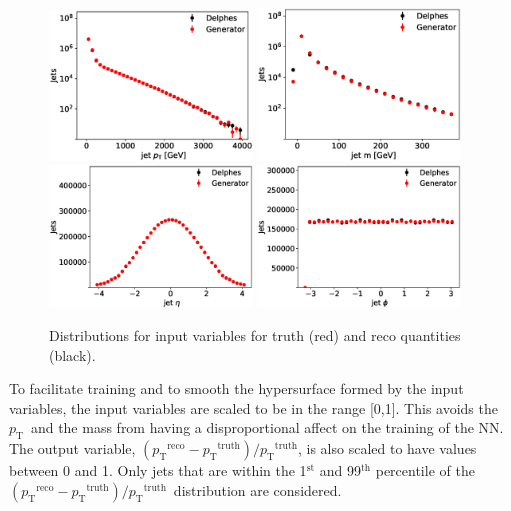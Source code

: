 \documentclass[showpacs,showkeys,preprint,prd,nofootinbib,linenumbers,12pt,superscriptaddress]{revtex4-1}
\def\pt{\ensuremath{p_{\mathrm{T}}}}
\def\ptRes{\ensuremath{(\pt^{\mathrm{reco}}-\pt^{\mathrm{truth}})/\pt^{\mathrm{truth}}}}
\begin{document}
\begin{figure}[h]
  \includegraphics[width=0.48\textwidth]{figures/nn/jet_pT_prescaling_log.eps}
  \includegraphics[width=0.48\textwidth]{figures/nn/jet_m_prescaling_log.eps}\\
  \includegraphics[width=0.48\textwidth]{figures/nn/jet_eta_prescaling.eps}
  \includegraphics[width=0.48\textwidth]{figures/nn/jet_phi_prescaling.eps}
  \caption{Distributions for input variables for truth (red) and reco quantities (black).}
  \label{fig:nnInputsPrescaling}
\end{figure}

To facilitate training and to smooth the hypersurface formed by the input variables, the input variables are scaled to be in the range [0,1]. This avoids the \pt\ and the mass from having a disproportional affect on the training of the NN. The output variable, \ptRes, is also scaled to have values between 0 and 1. Only jets that 
are within the 1$^{\mathrm{st}}$ and 99$^{\mathrm{th}}$ percentile of the \ptRes\ distribution are considered.
\end{document}
